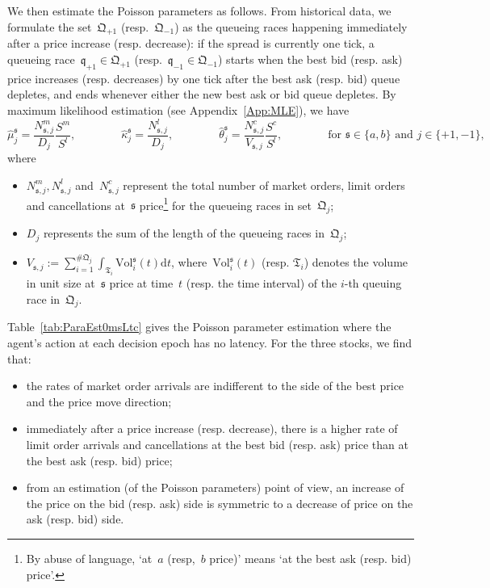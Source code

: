 \documentclass{amsart}[11pt]
\numberwithin{equation}{section}
\theoremstyle{definition}
\newcommand{\D}{\mathrm{d}}
\newcommand{\ssf}{\mathfrak{s}}
\newcommand{\Qf}{\mathfrak{Q}}
\newcommand{\qf}{\mathfrak{q}}
\begin{document}
We then estimate the Poisson parameters as follows.
From historical data, we formulate the set~$\Qf_{+1}$ (resp.~$\Qf_{-1}$) as the queueing races happening immediately after a price increase (resp. decrease):
if the spread is currently one tick, 
a queueing race~$\qf_{+1}\in\Qf_{+1}$ (resp.~$\qf_{-1}\in\Qf_{-1}$) starts when the best bid (resp. ask) price increases (resp. decreases) by one tick after the best ask (resp. bid) queue depletes, 
and ends whenever either the new best ask or bid queue depletes. 
By maximum likelihood estimation (see Appendix~\ref{App:MLE}), we have
\begin{equation}\label{eq:MaxLikelihoodResult}
\hat{\mu}^\ssf_{j}  = \frac{N^m_{\ssf, j}}{D_j}\frac{S^m}{S^l},\qquad\qquad
\hat{\kappa}^\ssf_{j}  = \frac{N^l_{\ssf, j}}{D_j},\qquad\qquad
\hat{\theta}^\ssf_{j}  = \frac{N^c_{\ssf, j}}{V_{\ssf, j}}\frac{S^c}{S^l},\qquad\qquad
\text{for }\ssf\in\{a, b\}\text{ and }j\in\{+1, -1\},
\end{equation}
where
\begin{itemize}
\item $N^m_{\ssf, j}, N^l_{\ssf, j}$ and~$N^c_{\ssf, j}$ represent the total number of market orders, limit orders and cancellations at~$\ssf$ price\footnote{By abuse of language, `at~$a$ (resp,~$b$ price)' means `at the best ask (resp. bid) price'.} for the queueing races in set~$\Qf_j$;
\item $D_j$ represents the sum of the length of the queueing races in~$\Qf_j$;
\item $V_{\ssf, j} := \displaystyle\sum_{i=1}^{\# \Qf_j}\int_{\mathfrak{T}_i} \textrm{Vol}^{\ssf}_i(t)\D t$,
where~$\textrm{Vol}^\ssf_i(t)$ (resp. $\mathfrak{T}_i$) denotes
the volume in unit size at~$\ssf$ price at time~$t$
(resp. the time interval) of the $i$-th queuing race in~$\Qf_j$.
\end{itemize}
Table~\ref{tab:ParaEst0msLtc} gives the Poisson parameter estimation where the agent's action at each decision epoch has no latency. For the three stocks, we find that:
\begin{itemize}
\item the rates of market order arrivals are indifferent to the side of the best price and the price move direction;
\item immediately after a price increase (resp. decrease), there is a higher rate of limit order arrivals and cancellations at the best bid (resp. ask) price than at the best ask (resp. bid) price;
\item from an estimation (of the Poisson parameters) point of view, an increase of the price on the bid (resp. ask) side is symmetric to a decrease of price on the ask (resp. bid) side.
\end{itemize}
\end{document}
